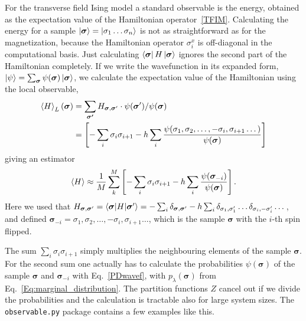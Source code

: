 \documentclass[submission, Phys]{SciPost}
\begin{document}
For the transverse field Ising model a standard observable is the energy, obtained as the expectation value of
the Hamiltonian operator~\ref{TFIM}.
Calculating the energy for a sample $\ket{\bm{\sigma} }= \ket{\sigma_1 \dots  \sigma_n}$ is not as straightforward as for the magnetization, 
because the Hamiltonian operator ${\sigma}^x_i$ is off-diagonal in the computational basis. 
Just calculating $\bra{\bm{\sigma} } H \ket{\bm{\sigma} }$ ignores the second part of the Hamiltonian completely. 
If we write the wavefunction in its expanded form, $\ket{\psi} = \sum_{\bm{\sigma}} \psi(\bm{\sigma}) \ket{\bm{\sigma}} $, 
we calculate the expectation value of the Hamiltonian using the local observable,
\begin{align}
\braket{ H}_L({\bm{\sigma}}) &= \sum_{ \bm{\sigma'}} H_{\bm{\sigma}, \bm{\sigma}'} \cdot \psi(\bm{\sigma}') / \psi(\bm{\sigma}) \\
&=   \left[ -\sum_i \sigma_i \sigma_{i+1} - h \sum_i \frac{\psi(\sigma_1, \sigma_2, \dots , -\sigma_i, \sigma_{i+1} \dots)}{\psi (\bm{\sigma})} \right]
\end{align}
giving an estimator
\begin{equation}
\braket{ H} \approx \frac{1}{M} \sum_k^M \left[ -\sum_i \sigma_i \sigma_{i+1} - h \sum_i \frac{\psi (\bm{\sigma}_{-i})}{\psi (\bm{\sigma})} \right].
\end{equation}
Here we used that $H_{\bm{\sigma}, \bm{\sigma}'}  = \braket{\bm{\sigma} | H | \bm{\sigma}'} = -\sum_i \delta_{\bm{\sigma}, \bm{\sigma}'} - h \sum_i \delta_{\sigma_1, \sigma_1'} \dots \delta_{\sigma_i, -\sigma_i'} \dots$, and defined $\bm{\sigma}_{-i} = \sigma_1, \sigma_2, \dots , -\sigma_i, \sigma_{i+1} \dots$, which is the sample $\bm{\sigma}$ with the $i$-th spin flipped.

The sum $\sum_i \sigma_i \sigma_{i+1}$ simply multiplies the neighbouring elements of the sample $\bm{\sigma}$. For the second sum one actually has to calculate the probabilities $\psi (\bm{\sigma})$ of the sample $\bm{\sigma}$ and $\bm{\sigma}_{-i} $ with
Eq.~\ref{PDwavef},
with $p_{\lambda}(\bm{\sigma})$ from Eq.~\ref{Eq:marginal_distribution}. The partition functions $Z$ cancel out if we divide the probabilities and the calculation is tractable also for large system sizes.
The \verb|observable.py| package contains a few examples like this.
\end{document}
